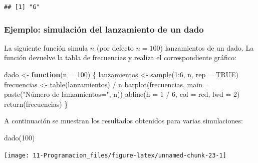\documentclass[
]{book}
\newenvironment{Shaded}{\begin{snugshade}}{\end{snugshade}}
\newcommand{\AttributeTok}[1]{\textcolor[rgb]{0.77,0.63,0.00}{#1}}
\newcommand{\ConstantTok}[1]{\textcolor[rgb]{0.00,0.00,0.00}{#1}}
\newcommand{\ControlFlowTok}[1]{\textcolor[rgb]{0.13,0.29,0.53}{\textbf{#1}}}
\newcommand{\DecValTok}[1]{\textcolor[rgb]{0.00,0.00,0.81}{#1}}
\newcommand{\FunctionTok}[1]{\textcolor[rgb]{0.00,0.00,0.00}{#1}}
\newcommand{\NormalTok}[1]{#1}
\newcommand{\OtherTok}[1]{\textcolor[rgb]{0.56,0.35,0.01}{#1}}
\newcommand{\SpecialCharTok}[1]{\textcolor[rgb]{0.00,0.00,0.00}{#1}}
\newcommand{\StringTok}[1]{\textcolor[rgb]{0.31,0.60,0.02}{#1}}
\theoremstyle{break}
\theoremstyle{nonumberplain}
\begin{document}
\begin{verbatim}
## [1] "G"
\end{verbatim}

\hypertarget{ejemplo-simulaciuxf3n-del-lanzamiento-de-un-dado}{%
\subsubsection{Ejemplo: simulación del lanzamiento de un dado}\label{ejemplo-simulaciuxf3n-del-lanzamiento-de-un-dado}}

La siguiente función simula \(n\) (por defecto \(n=100\)) lanzamientos de un
dado. La función devuelve la tabla de frecuencias y realiza el
correspondiente gráfico:

\begin{Shaded}
\begin{Highlighting}[]
\NormalTok{dado }\OtherTok{\textless{}{-}} \ControlFlowTok{function}\NormalTok{(}\AttributeTok{n =} \DecValTok{100}\NormalTok{) \{}
\NormalTok{  lanzamientos }\OtherTok{\textless{}{-}} \FunctionTok{sample}\NormalTok{(}\DecValTok{1}\SpecialCharTok{:}\DecValTok{6}\NormalTok{, n, }\AttributeTok{rep =} \ConstantTok{TRUE}\NormalTok{)}
\NormalTok{  frecuencias }\OtherTok{\textless{}{-}} \FunctionTok{table}\NormalTok{(lanzamientos) }\SpecialCharTok{/}\NormalTok{ n}
  \FunctionTok{barplot}\NormalTok{(frecuencias, }\AttributeTok{main =} \FunctionTok{paste}\NormalTok{(}\StringTok{"Número de lanzamientos="}\NormalTok{, n))}
  \FunctionTok{abline}\NormalTok{(}\AttributeTok{h =} \DecValTok{1} \SpecialCharTok{/} \DecValTok{6}\NormalTok{, }\AttributeTok{col =} \StringTok{\textquotesingle{}red\textquotesingle{}}\NormalTok{, }\AttributeTok{lwd =} \DecValTok{2}\NormalTok{)}
  \FunctionTok{return}\NormalTok{(frecuencias)}
\NormalTok{\}}
\end{Highlighting}
\end{Shaded}

A continuación se muestran los resultados obtenidos para
varias simulaciones:

\begin{Shaded}
\begin{Highlighting}[]
\FunctionTok{dado}\NormalTok{(}\DecValTok{100}\NormalTok{)}
\end{Highlighting}
\end{Shaded}

\begin{center}\texttt{[image: 11-Programacion\_files/figure-latex/unnamed-chunk-23-1]} \end{center}
\end{document}
